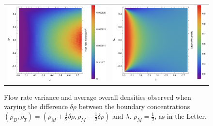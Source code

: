 \documentclass[
reprint,
 amsmath,amssymb,
 aps,
 prl,
]{revtex4-1}
\begin{document}
\begin{figure}[h!]
\vspace{1em}
\caption{\label{fig:fullConstDens} Flow rate variance and average overall densities observed when varying the difference $\delta\rho$ between the boundary concentrations
$(\rho_B, \rho_T) = (\rho_M + \frac{1}{2} \delta\rho, \rho_M - \frac{1}{2} \delta\rho)$ and $\lambda$. $\rho_M=\frac{1}{2}$, as in the Letter.}
\begin{center}
 \begin{tabular}{c|c}
    \includegraphics[width=0.5\linewidth]{images/newConstVar} & \includegraphics[width=0.5\linewidth]{images/newConstDens} \\
    \end{tabular}
\end{center}
    \vspace{0em}
\end{figure}
\end{document}
